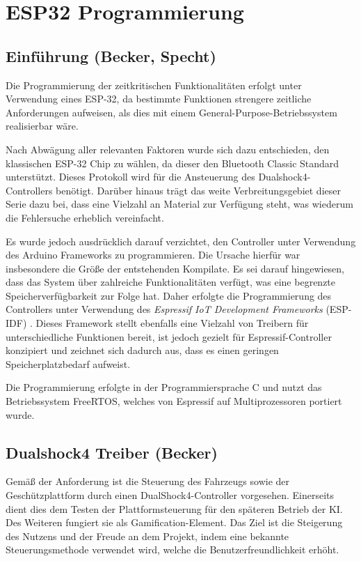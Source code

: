 \chapter{ESP32 Programmierung}

\section{Einführung (Becker, Specht)}

Die Programmierung der zeitkritischen Funktionalitäten erfolgt unter Verwendung eines \mbox{ESP-32}, da bestimmte Funktionen strengere zeitliche Anforderungen aufweisen, als dies mit einem General-Purpose-Betriebssystem realisierbar wäre.

Nach Abwägung aller relevanten Faktoren wurde sich dazu entschieden, den klassischen \mbox{ESP-32} Chip zu wählen, da dieser den Bluetooth Classic Standard unterstützt. 
Dieses Protokoll wird für die Ansteuerung des Dualshock4-Controllers benötigt.
Darüber hinaus trägt das weite Verbreitungsgebiet dieser Serie dazu bei, dass eine Vielzahl an Material zur Verfügung steht, was wiederum die Fehlersuche erheblich vereinfacht.

Es wurde jedoch ausdrücklich darauf verzichtet, den Controller unter Verwendung des Arduino Frameworks zu programmieren. 
Die Ursache hierfür war insbesondere die Größe der entstehenden Kompilate. 
Es sei darauf hingewiesen, dass das System über zahlreiche Funktionalitäten verfügt, was eine begrenzte Speicherverfügbarkeit zur Folge hat. 
Daher erfolgte die Programmierung des Controllers unter Verwendung des \textit{Espressif IoT Development Frameworks} (ESP-IDF) \cite{esp_esp_idf}. 
Dieses Framework stellt ebenfalls eine Vielzahl von Treibern für unterschiedliche Funktionen bereit, ist jedoch gezielt für Espressif-Controller konzipiert und zeichnet sich dadurch aus, dass es einen geringen Speicherplatzbedarf aufweist. 

Die Programmierung erfolgte in der Programmiersprache C und nutzt das Betriebssystem FreeRTOS, welches von Espressif auf Multiprozessoren portiert wurde.

\section{Dualshock4 Treiber (Becker)}

Gemäß der Anforderung ist die Steuerung des Fahrzeugs sowie der Geschützplattform durch einen DualShock4-Controller vorgesehen. 
Einerseits dient dies dem Testen der Plattformsteuerung für den späteren Betrieb der KI. 
Des Weiteren fungiert sie als Gamification-Element. 
Das Ziel ist die Steigerung des Nutzens und der Freude an dem Projekt, indem eine bekannte Steuerungsmethode verwendet wird, welche die Benutzerfreundlichkeit erhöht.

